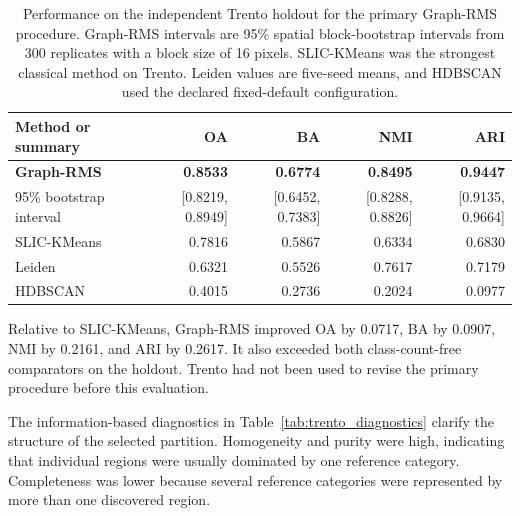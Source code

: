 \documentclass[10pt,a4paper,fleqn]{article}
\begin{document}
\begin{table}[!t]
\centering
\footnotesize
\caption{Performance on the independent Trento holdout for the primary
Graph-RMS procedure. Graph-RMS intervals are
95\% spatial block-bootstrap intervals from 300 replicates with a block size
of 16 pixels. SLIC-KMeans was the strongest classical method on Trento.
Leiden values are five-seed means, and HDBSCAN used the declared fixed-default
configuration.}
\label{tab:trento_comparison}

\renewcommand{\arraystretch}{1.08}
\setlength{\tabcolsep}{5pt}

\begin{tabular}{@{}lrrrr@{}}
\toprule
Method or summary & OA & BA & NMI & ARI \\
\midrule
\textbf{Graph-RMS}
& \textbf{0.8533}
& \textbf{0.6774}
& \textbf{0.8495}
& \textbf{0.9447} \\

95\% bootstrap interval
& [0.8219, 0.8949]
& [0.6452, 0.7383]
& [0.8288, 0.8826]
& [0.9135, 0.9664] \\

SLIC-KMeans
& 0.7816
& 0.5867
& 0.6334
& 0.6830 \\

Leiden
& 0.6321
& 0.5526
& 0.7617
& 0.7179 \\

HDBSCAN
& 0.4015
& 0.2736
& 0.2024
& 0.0977 \\
\bottomrule
\end{tabular}
\end{table}

Relative to SLIC-KMeans, Graph-RMS improved OA by 0.0717, BA by 0.0907,
NMI by 0.2161, and ARI by 0.2617. It also exceeded both class-count-free
comparators on the holdout. Trento had not been used to revise the primary procedure before this
evaluation.

The information-based diagnostics in Table~\ref{tab:trento_diagnostics}
clarify the structure of the selected partition. Homogeneity and purity were
high, indicating that individual regions were usually dominated by one
reference category. Completeness was lower because several reference
categories were represented by more than one discovered region.
\end{document}
